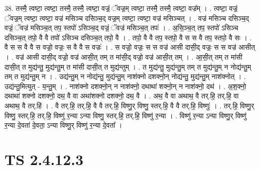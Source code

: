 \documentclass[17pt]{extarticle}
\begin{document}
38. तस्मै॒ त्वष्टा॒ त्वष्टा॒ तस्मै॒ तस्मै॒ त्वष्टा॒ वज्रं॒ ॅवज्र॒म् त्वष्टा॒ तस्मै॒ तस्मै॒ त्वष्टा॒ वज्र᳚म् । . त्वष्टा॒ वज्रं॒ ॅवज्र॒म् त्वष्टा॒ त्वष्टा॒ वज्र॑ मसिञ्च दसिञ्च॒द् वज्र॒म् त्वष्टा॒ त्वष्टा॒ वज्र॑ मसिञ्चत् । . वज्र॑ मसिञ्च दसिञ्च॒द् वज्रं॒ ॅवज्र॑ मसिञ्च॒त् तप॒ स्तपो॑ ऽसिञ्च॒द् वज्रं॒ ॅवज्र॑ मसिञ्च॒त् तपः॑ । . अ॒सि॒ञ्च॒त् तप॒ स्तपो॑ ऽसिञ्च दसिञ्च॒त् तपो॒ वै वै तपो॑ ऽसिञ्च दसिञ्च॒त् तपो॒ वै । . तपो॒ वै वै तप॒ स्तपो॒ वै स स वै तप॒ स्तपो॒ वै सः । . वै स स वै वै स वज्रो॒ वज्रः॒ स वै वै स वज्रः॑ । . स वज्रो॒ वज्रः॒ स स वज्र॑ आसी दासी॒द् वज्रः॒ स स वज्र॑ आसीत् । . वज्र॑ आसी दासी॒द् वज्रो॒ वज्र॑ आसी॒त् तम् त मा॑सी॒द् वज्रो॒ वज्र॑ आसी॒त् तम् । . आ॒सी॒त् तम् त मा॑सी दासी॒त् त मुद्य॑न्तु॒ मुद्य॑न्तु॒म् त मा॑सी दासी॒त् त मुद्य॑न्तुम् । . त मुद्य॑न्तु॒ मुद्य॑न्तु॒म् तम् त मुद्य॑न्तु॒म् न नोद्य॑न्तु॒म् तम् त मुद्य॑न्तु॒म् न । . उद्य॑न्तु॒म् न नोद्य॑न्तु॒ मुद्य॑न्तु॒म् नाश॑क्नो दशक्नो॒न् नोद्य॑न्तु॒ मुद्य॑न्तु॒म् नाश॑क्नोत् । . उद्य॑न्तु॒मित्युत् - य॒न्तु॒म् । . नाश॑क्नो दशक्नो॒न् न नाश॑क्नो॒ दथाथा॑ शक्नो॒न् न नाश॑क्नो॒ दथ॑ । . अ॒श॒क्नो॒ दथाथा॑ शक्नो दशक्नो॒ दथ॒ वै वा अथा॑शक्नो दशक्नो॒ दथ॒ वै । . अथ॒ वै वा अथाथ॒ वै तर्.हि॒ तर्.हि॒ वा अथाथ॒ वै तर्.हि॑ । . वै तर्.हि॒ तर्.हि॒ वै वै तर्.हि॒ विष्णु॒र् विष्णु॒ स्तर्.हि॒ वै वै तर्.हि॒ विष्णुः॑ । . तर्.हि॒ विष्णु॒र् विष्णु॒ स्तर्.हि॒ तर्.हि॒ विष्णु॑ र॒न्या ऽन्या विष्णु॒ स्तर्.हि॒ तर्.हि॒ विष्णु॑ र॒न्या । . विष्णु॑ र॒न्या ऽन्या विष्णु॒र् विष्णु॑ र॒न्या दे॒वता॑ दे॒वता॒ ऽन्या विष्णु॒र् विष्णु॑ र॒न्या दे॒वता᳚ । \newline
\pagebreak
{}
\section*{ TS 2.4.12.3 }
\end{document}
